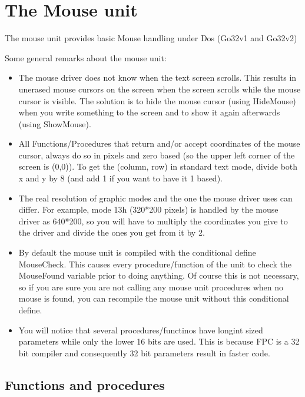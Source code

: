 \chapter{The Mouse unit}

The mouse unit provides basic Mouse handling under Dos (Go32v1 and Go32v2)

Some general remarks about the mouse unit:

\begin{itemize}
\item The mouse driver does not know when the text screen scrolls. This results
in unerased mouse cursors on the screen when the screen scrolls while the
mouse cursor is visible. The solution is to hide the mouse cursor (using
HideMouse) when you write something to the screen and to show it again
afterwards (using ShowMouse).

\item All Functions/Procedures that return and/or accept coordinates of the mouse
cursor, always do so in pixels and zero based (so the upper left corner of
the screen is (0,0)). To get the (column, row) in standard text mode, divide
both x and y by 8 (and add 1 if you want to have it 1 based).

\item The real resolution of graphic modes and the one the mouse driver uses can
differ. For example, mode 13h (320*200 pixels) is handled by the mouse driver
as 640*200, so you will have to multiply the coordinates you give to the
driver and divide the ones you get from it by 2.

\item By default the mouse unit is compiled with the conditional define
MouseCheck. This causes every procedure/function of the unit to check the
MouseFound variable prior to doing anything. Of course this is not necessary,
so if you are sure you are not calling any mouse unit procedures when no
mouse is found, you can recompile the mouse unit without this conditional
define.

\item
You will notice that several procedures/functinos have longint sized
parameters while only the lower 16 bits are used. This is because FPC is
a 32 bit compiler and consequently 32 bit parameters result in faster code.
\end{itemize}

\section{Functions and procedures}

